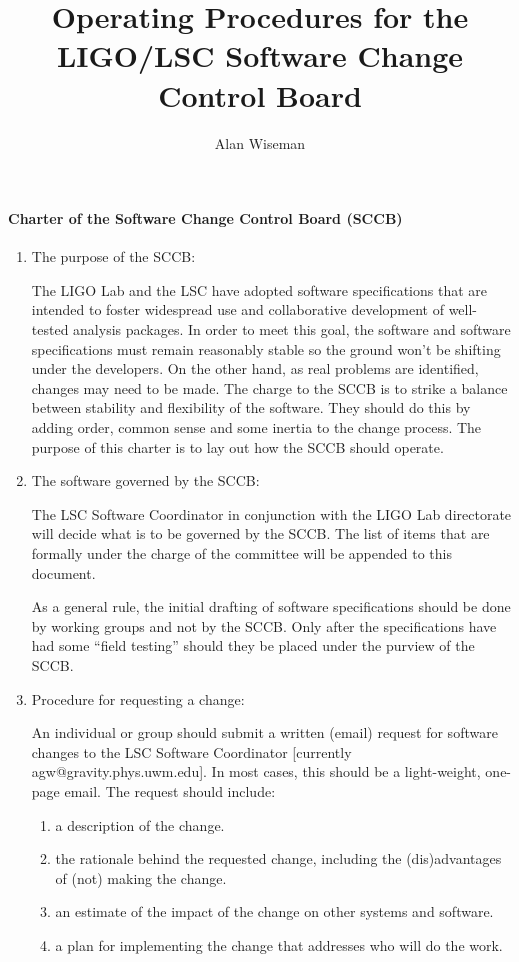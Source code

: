 \documentclass[]{ligodcc}
\title{ Operating Procedures for the LIGO/LSC  Software Change Control Board}
\author{Alan Wiseman}
\begin{document}
\maketitle

\paragraph*{Charter of the Software Change Control Board (SCCB)\\}
\begin{enumerate}
\item
\vskip -0.3in
The purpose of the SCCB:

The LIGO Lab and the LSC have adopted software specifications that are
intended to foster widespread use and collaborative development of
well-tested analysis packages.  In order to meet this goal, the
software and software specifications must remain reasonably stable
so the ground won't be shifting under the developers.  On the other
hand, as real problems are identified, changes may need to be made.
The charge to the SCCB is to strike a balance between stability and
flexibility of the software. They should do this by adding order,
common sense and some inertia to the change process.  The purpose of
this charter is to lay out how the SCCB should operate.


\item
The software governed by the SCCB:

The LSC Software Coordinator in conjunction with the LIGO Lab
directorate will decide what is to be governed by the SCCB.  The list
of items that are formally under the charge of the committee will be
appended to this document.

As a general rule, the initial drafting of software specifications
should be done by working groups and not by the SCCB.  Only after the
specifications have had some ``field testing'' should they be placed
under the purview of the SCCB.

\item
Procedure for requesting a change:

An individual or group should submit a written (email) request for
software changes to the LSC Software Coordinator [currently
agw@gravity.phys.uwm.edu].  In most cases, this should be a
light-weight, one-page email. The request should include:

   \begin{enumerate}
   \item
   \vskip -0.1in
   a description of the change.
   \item
   the rationale behind the requested change, including the
   (dis)advantages of (not) making the change.
   \item
   an estimate of the impact of the change on other systems and
   software.
   \item
   a plan for implementing the change that addresses who will
   do the work.
   \end{enumerate}


\end{enumerate}
\end{document}
